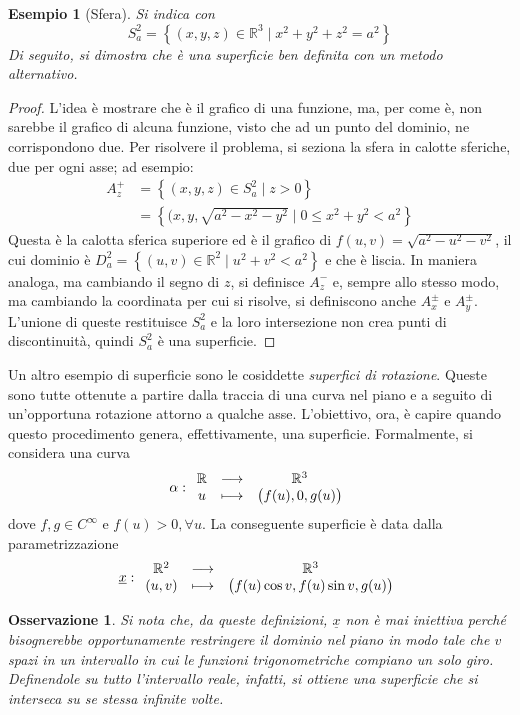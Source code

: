 \documentclass[12pt]{article}
\theoremstyle{style}
\newtheorem{esempio}{Esempio}[section]
\newtheorem{osservazione}{Osservazione}[section]
\numberwithin{equation}{subsection}
\begin{document}
\begin{esempio}
	[Sfera]
	Si indica con 
	\[
	S^2_a = \left\{ (x,y,z) \in \mathbb{R}^3  \mid x^2 + y^2 + z^2 = a^2 \right\} 
	\] 
	Di seguito, si dimostra che \`e una superficie ben definita con un metodo alternativo.
\end{esempio}
\begin{proof}
	L'idea \`e mostrare che \`e il grafico di una funzione, ma, per come \`e, non sarebbe il grafico di alcuna funzione, visto che ad un punto del dominio, ne corrispondono due.
	Per risolvere il problema, si seziona la sfera in calotte sferiche, due per ogni asse; ad esempio:
	\[
		\begin{split}
			A_z^+ &= \left\{ (x,y,z) \in S_a^2  \mid z >0 \right\} \\
			      &= \left\{ (x,y,\sqrt{a^2 - x^2 - y^2}  \mid 0 \le x^2 + y^2 < a^2 \right\} 
		\end{split}
	\] 
	Questa \`e la calotta sferica superiore ed \`e il grafico di $f (u,v) = \sqrt{a^2 - u ^2 - v^2} $, il cui dominio \`e $D^2 _a = \left\{ (u,v) \in \mathbb{R}^2  \mid u^2 + v^2 < a^2 \right\} $ e che \`e liscia.
	In maniera analoga, ma cambiando il segno di $z$, si definisce $A^-_z$ e, sempre allo stesso modo, ma cambiando la coordinata per cui si risolve, si definiscono anche $A^{\pm} _x$ e $A^{\pm} _y$.
	L'unione di queste restituisce $S^2_a$ e la loro intersezione non crea punti di discontinuit\`a, quindi $S^2_a$ \`e una superficie.
\end{proof}
\noindent Un altro esempio di superficie sono le cosiddette \textit{superfici di rotazione}.
Queste sono tutte ottenute a partire dalla traccia di una curva nel piano e a seguito di un'opportuna rotazione attorno a qualche asse.
L'obiettivo, ora, \`e capire quando questo procedimento genera, effettivamente, una superficie.
Formalmente, si considera una curva 
\[
\alpha : 
\begin{array}
	{c c c}
	\mathbb{R} & \longrightarrow & \mathbb{R}^3\\
	u&\longmapsto & \big(f(u) , 0 , g(u)\big)
\end{array}
\] 
dove $f,g \in C^\infty$ e $f(u) > 0,  \forall u$.
La conseguente superficie \`e data dalla parametrizzazione
\[
\underline{x}:
\begin{array}
	{c c c}
	\mathbb{R}^2 & \longrightarrow & \mathbb{R}^3\\
	(u,v) &\longmapsto & \big(f(u) \cos v, f(u) \sin v , g(u)\big)
\end{array}
\] 
\begin{osservazione}
Si nota che, da queste definizioni, $\underline{x}$ non \`e mai iniettiva perch\'e bisognerebbe opportunamente restringere il dominio nel piano in modo tale che $v$ spazi in un intervallo in cui le funzioni trigonometriche compiano un solo giro.
Definendole su tutto l'intervallo reale, infatti, si ottiene una superficie che si interseca su se stessa infinite volte.
\end{osservazione}
\end{document}
